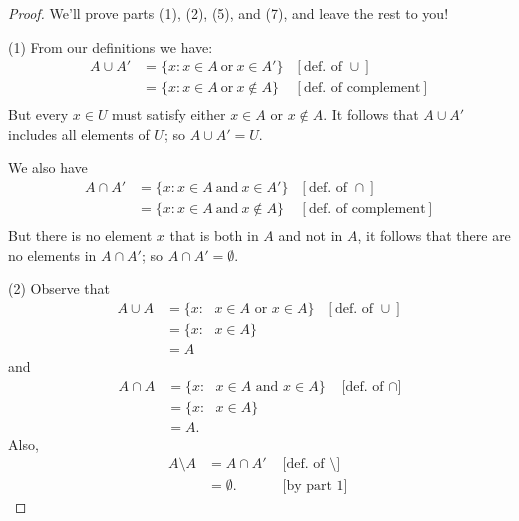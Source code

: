 %
%
%
\begin{proof}
We'll prove parts (1), (2), (5), and (7), and leave the rest to you!

\noindent
(1)
From our definitions we have:
\begin{align*}
A \cup A' & =  \{ x : x \in A \mathrm{~or~} x \in A' \}  & [\text{def. of } \cup ]\\
& =  \{ x : x \in A \mathrm{~or~} x \notin A \}  & [\text{def. of complement} ]  \\
\end{align*}
But every $x \in U$ must satisfy either $x \in A$ or $x \notin A$. It follows that $A \cup A'$ includes all elements of $U$; so $A \cup A' = U$.

\noindent
We also have 
\begin{align*}
A \cap A' & =  \{ x : x \in A \mathrm{~and~} x \in A' \}  & [\text{def. of } \cap ]\\
& =  \{ x : x \in A \mathrm{~and~} x \notin A \}  & [\text{def. of complement} ]  \\
\end{align*}
But there is no element $x$ that is both in $A$ and not in $A$, it follows that there are no elements in $A \cap A'$; so $A \cap A' = \emptyset$.

\noindent
(2)
Observe that
\begin{align*}
A \cup A & =  \{ x : \mbox{ $x \in A$ or $x \in A$} \}    & [\text{def. of } \cup]  \\
& =  \{ x : \mbox{ $x \in A$} \} \\
& =  A
\end{align*}
and
\begin{align*}
A \cap A & =  \{ x : \mbox{ $x \in A$ and $x \in A$} \}    &\text{ [def. of } \cap] \\
& =  \{ x : \mbox{ $x \in A$}  \} \\
& =  A.
\end{align*}
Also, 
\begin{align*}
A \setminus A &= A \cap A'    &\mbox{ [def. of } \setminus] \\
&= \emptyset.    &\mbox{ [by part 1] }
\end{align*}


\end{proof}
